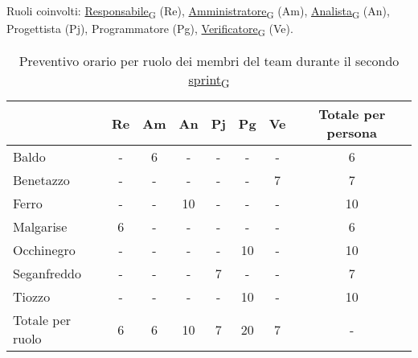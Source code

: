 Ruoli coinvolti: \href{https://7last.github.io/docs/rtb/documentazione-interna/glossario\#responsabile}{Responsabile\textsubscript{G}} (Re), \href{https://7last.github.io/docs/rtb/documentazione-interna/glossario\#amministratore}{Amministratore\textsubscript{G}} (Am), \href{https://7last.github.io/docs/rtb/documentazione-interna/glossario\#analista}{Analista\textsubscript{G}} (An), Progettista (Pj), Programmatore (Pg), \href{https://7last.github.io/docs/rtb/documentazione-interna/glossario\#verificatore}{Verificatore\textsubscript{G}} (Ve).
\begin{table}[!h]
	\centering
	\begin{tabular}{ | l | c | c | c | c | c | c | c | }
		\hline
		\textbf{}        & \textbf{Re} & \textbf{Am} & \textbf{An} & \textbf{Pj} & \textbf{Pg} & \textbf{Ve} & \textbf{Totale per persona} \\
		\hline
		Baldo            & -           & 6           & -           & -           & -           & -           & 6                           \\
		Benetazzo        & -           & -           & -           & -           & -           & 7           & 7                           \\
		Ferro            & -           & -           & 10          & -           & -           & -           & 10                          \\
		Malgarise        & 6           & -           & -           & -           & -           & -           & 6                           \\
		Occhinegro       & -           & -           & -           & -           & 10          & -           & 10                          \\
		Seganfreddo      & -           & -           & -           & 7           & -           & -           & 7                           \\
		Tiozzo           & -           & -           & -           & -           & 10          & -           & 10                          \\
		\hline
		Totale per ruolo & 6           & 6           & 10          & 7           & 20          & 7           & -                           \\
		\hline
	\end{tabular}
	\caption{Preventivo orario per ruolo dei membri del team durante il secondo \href{https://7last.github.io/docs/rtb/documentazione-interna/glossario\#sprint}{sprint\textsubscript{G}}}
	
\end{table}

